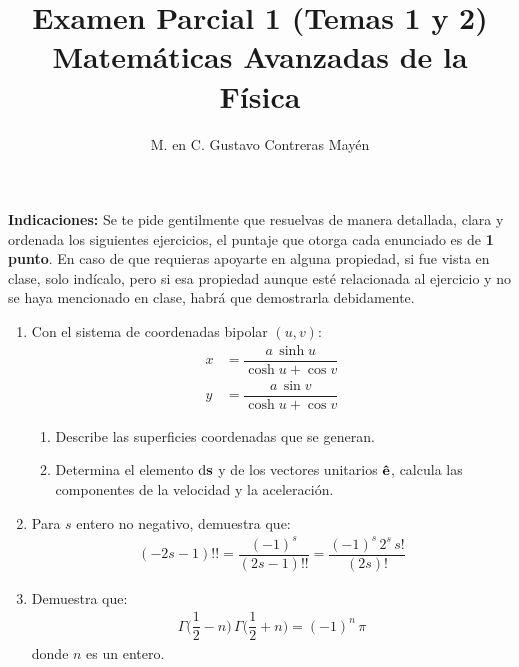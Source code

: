 \documentclass[hidelinks,12pt]{article}
\title{Examen Parcial 1 (Temas 1 y 2)\\[0.3em]  \large{Matemáticas Avanzadas de la Física}\vspace{-3ex}}
\author{M. en C. Gustavo Contreras Mayén}
\date{ }
\begin{document}
\vspace{-4cm}
\maketitle

\fontsize{14}{14}\selectfont

\textbf{Indicaciones: } Se te pide gentilmente que resuelvas de manera detallada, clara y ordenada los siguientes ejercicios, el puntaje que otorga cada enunciado es de \textbf{1 punto}. En caso de que requieras apoyarte en alguna propiedad, si fue vista en clase, solo indícalo, pero si esa propiedad aunque esté relacionada al ejercicio y no se haya mencionado en clase, habrá que demostrarla debidamente.

\begin{enumerate}
\item Con el sistema de coordenadas bipolar $(u, v)$:
\begin{align*}
x &= \dfrac{a \, \sinh u}{\cosh u + \cos v} \\[0.5em]
y &= \dfrac{a \, \sin v}{\cosh u + \cos v}
\end{align*}
\begin{enumerate}[label=\alph*)]
\item Describe las superficies coordenadas que se generan.
\item \label{inciso_1_b} Determina el elemento $\dd{\vb{s}}$ y de los vectores unitarios $\vu{e}$, calcula las componentes de la velocidad y la aceleración.
\end{enumerate}
\item Para $s$ entero no negativo, demuestra que:
\begin{align*}
(- 2 s - 1)!! = \dfrac{(-1)^{s}}{(2 s - 1)!!} = \dfrac{(-1)^{s} \, 2^{s} \, s!}{(2 s)!}
\end{align*}
\item Demuestra que:
\begin{align*}
\Gamma \bigg( \dfrac{1}{2} - n \bigg) \, \Gamma \bigg( \dfrac{1}{2} + n \bigg) = (-1)^{n} \, \pi
\end{align*}
donde $n$ es un entero.

\end{enumerate}
\end{document}
